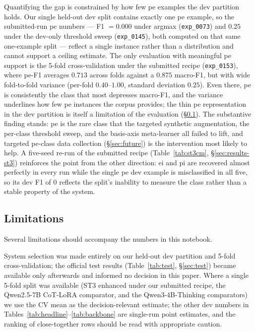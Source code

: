 Quantifying the gap is constrained by how few \textsf{pe} examples the dev partition holds. Our single held-out dev split contains exactly one \textsf{pe} example, so the submitted-run \textsf{pe} numbers --- F1 $=0.000$ under argmax (\texttt{exp\_0073}) and $0.25$ under the dev-only threshold sweep (\texttt{exp\_0145}), both computed on that same one-example split --- reflect a single instance rather than a distribution and cannot support a ceiling estimate. The only evaluation with meaningful \textsf{pe} support is the 5-fold cross-validation under the submitted recipe (\texttt{exp\_0153}), where \textsf{pe}-F1 averages $0.713$ across folds against a $0.875$ macro-F1, but with wide fold-to-fold variance (per-fold $0.40$--$1.00$, standard deviation $0.25$). %
Even there, \textsf{pe} is consistently the class that most depresses macro-F1, and the variance underlines how few \textsf{pe} instances the corpus provides; the thin \textsf{pe} representation in the dev partition is itself a limitation of the evaluation (\S\ref{sec:limitations}). The substantive finding stands: \textsf{pe} is the rare class that the targeted synthetic augmentation, the per-class threshold sweep, and the basis-axis meta-learner all failed to lift, and targeted \textsf{pe}-class data collection (\S\ref{sec:future}) is the intervention most likely to help. A five-seed re-run of the submitted recipe (Table~\ref{tab:st3cm}, \S\ref{sec:results-st3}) reinforces the point from the other direction: \textsf{ei} and \textsf{pi} are recovered almost perfectly in every run while the single \textsf{pe} dev example is misclassified in all five, so its dev F1 of $0$ reflects the split's inability to measure the class rather than a stable property of the system.

\subsection{Limitations}
\label{sec:limitations}

Several limitations should accompany the numbers in this notebook.

System selection was made entirely on our held-out dev partition and 5-fold cross-validation; the official test results (Table~\ref{tab:test}, \S\ref{sec:test}) became available only afterwards and informed no decision in this paper. Where a single 5-fold split was available (ST3 enhanced under our submitted recipe, the Qwen2.5-7B CoT-LoRA comparator, and the Qwen3-4B-Thinking comparators) we use the CV mean as the decision-relevant estimate; the other dev numbers in Tables~\ref{tab:headline}--\ref{tab:backbone} are single-run point estimates, and the ranking of close-together rows should be read with appropriate caution. %

